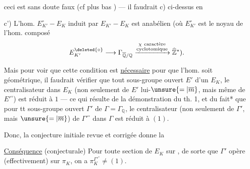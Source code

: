 ceci est sans doute faux (cf plus bas ) --- il faudrait    c) ci-dessus en

c') L'hom. $E_{K'}^\circ-E_K$ induit par $E_{K'}-E_K$ est anabélien (où $E_{K'}^\circ$ est le noyau de l'hom. composé
\[
E_{K'}^{\deleted{\circ}}\longrightarrow\Gamma_{\overline{\mathbb Q}/\mathbb Q}\xrightarrow{\substack{\chi\ \text{caractère}\\\text{cyclotomique}}}\widehat{\mathbb Z}^{*}).
\]

Mais pour voir que cette condition est \uline{nécessaire} pour que l'hom. soit géométrique, il faudrait  vérifier que  tout sous-groupe ouvert $E'$ d'un $E_K$, le centralisateur dans $E_K$ (non seulement de $E'$ lui-$\unsure{=|\overline m}$, mais même de $E'^\circ$) est réduit à $1$ --- ce qui résulte de la démonstration du th. 1, et du fait* que pour tt sous-groupe ouvert $\Gamma'$ de $\Gamma=\Gamma_{\mathbb Q}$, le centralisateur (non seulement de $\Gamma'$, mais $\unsure{=|\overline m}$) de $\Gamma'^\circ$ dans $\Gamma$ est réduit à $(1)$.

Donc, la conjecture initiale revue et corrigée donne la

\uline{Conséquence} (conjecturale) Pour toute  section de $E_K$ sur  , de sorte que $\Gamma'$ opère (effectivement) sur $\pi_K$, on a  $\pi_K^{\Gamma'^\circ}\ne(1)$.
